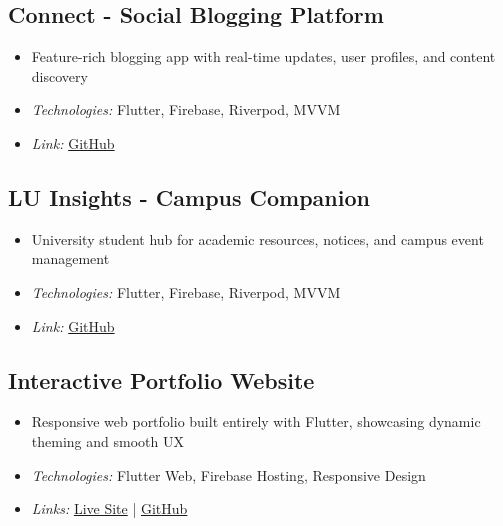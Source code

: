 \documentclass[a4paper,11pt]{article}
\begin{document}
\subsection{Connect - Social Blogging Platform}
\begin{itemize}[leftmargin=*,noitemsep,topsep=4pt]
    \item Feature-rich blogging app with real-time updates, user profiles, and content discovery
    \item \textit{Technologies:} Flutter, Firebase, Riverpod, MVVM
    \item \textit{Link:} \href{https://github.com/riyad-from-space/Connect.git}{GitHub}
\end{itemize}

\subsection{LU Insights - Campus Companion}
\begin{itemize}[leftmargin=*,noitemsep,topsep=4pt]
    \item University student hub for academic resources, notices, and campus event management
    \item \textit{Technologies:} Flutter, Firebase, Riverpod, MVVM
    \item \textit{Link:} \href{https://github.com/riyad-from-space/LU-Insights.git}{GitHub}
\end{itemize}

\subsection{Interactive Portfolio Website}
\begin{itemize}[leftmargin=*,noitemsep,topsep=4pt]
    \item Responsive web portfolio built entirely with Flutter, showcasing dynamic theming and smooth UX
    \item \textit{Technologies:} Flutter Web, Firebase Hosting, Responsive Design
    \item \textit{Links:} \href{https://riyad-portfolio-f18db.web.app}{Live Site} | \href{https://github.com/riyad-from-space/Riyad-s-Portfolio.git}{GitHub}
\end{itemize}

\end{document}
